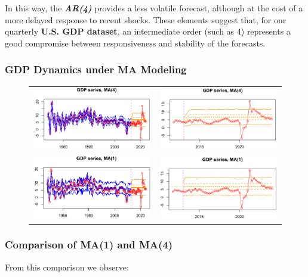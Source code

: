 \documentclass{Configuration_Files/PoliMi3i_thesis}
\begin{document}
In this way, the \textbf{\textit{AR(4)}} provides a less volatile forecast, although at the cost of a more delayed response to recent shocks. These elements suggest that, for our quarterly \textbf{U.S. GDP dataset}, an intermediate order (such as 4) represents a good compromise between responsiveness and stability of the forecasts.



\subsubsection{GDP Dynamics under MA Modeling}


\begin{figure}[H]
  \centering
  \begin{tabular}{@{}cc@{}}
    \includegraphics[angle=90,width=0.33\linewidth]{FMA(4)-1.png} &
    \includegraphics[angle=90,width=0.33\linewidth]{ZMA(4)-1.png} \\
    \includegraphics[angle=90,width=0.33\linewidth]{FMA(1)-1.png} &
    \includegraphics[angle=90,width=0.335\linewidth]{ZMA(1)-1.png}
  \end{tabular}
\end{figure}

\newpage
\subsubsection*{Comparison of MA(1) and MA(4)}
 From this comparison we observe:
\end{document}
